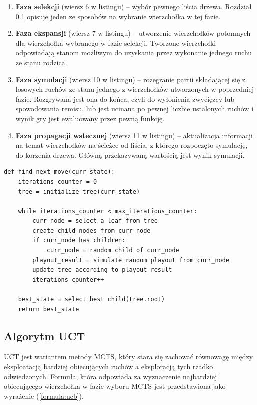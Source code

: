 \documentclass[a4paper,12pt]{article}
\begin{document}
\begin{enumerate}
	\item \textbf{Faza selekcji} (wiersz 6 w listingu) -- wybór pewnego liścia drzewa. Rozdział \ref{subsec:uct} opisuje jeden ze sposobów na wybranie wierzchołka w tej fazie.
	\item \textbf{Faza ekspansji} (wiersz 7 w listingu) -- utworzenie wierzchołków potomnych dla wierzchołka wybranego w fazie selekcji. Tworzone wierzchołki odpowiadają stanom możliwym do uzyskania przez wykonanie jednego ruchu ze stanu rodzica.
	\item \textbf{Faza symulacji} (wiersz 10 w listingu) -- rozegranie partii składającej się z losowych ruchów ze stanu jednego z wierzchołków utworzonych w poprzedniej fazie. Rozgrywana jest ona do końca, czyli do wyłonienia zwycięzcy lub spowodowania remisu, lub jest ucinana po pewnej liczbie ustalonych ruchów i wynik gry jest ewaluowany przez pewną funkcję.
	\item \textbf{Faza propagacji wstecznej} (wiersz 11 w listingu) -- aktualizacja informacji na temat wierzchołków na ścieżce od liścia, z którego rozpoczęto symulację, do korzenia drzewa. Główną przekazywaną wartością jest wynik symulacji.
\end{enumerate}

\begin{minipage}{\linewidth} %
	\begin{lstlisting}[caption={Pseudokod algorytmu Monte Carlo Tree Search}, label=lst:mcts, style=mystyle]
def find_next_move(curr_state):
	iterations_counter = 0
	tree = initialize_tree(curr_state)
	
	while iterations_counter < max_iterations_counter:
		curr_node = select a leaf from tree
		create child nodes from curr_node
		if curr_node has children:
			curr_node = random child of curr_node
		playout_result = simulate random playout from curr_node     
		update tree according to playout_result                     
		iterations_counter++
	
	best_state = select best child(tree.root) 
	return best_state
	\end{lstlisting}
\end{minipage}


\subsection{Algorytm UCT} \label{subsec:uct}
UCT jest wariantem metody MCTS, który stara się zachować równowagę między eksploatacją bardziej obiecujących ruchów a eksploracją tych rzadko odwiedzonych. Formuła, która odpowiada za wyznaczenie najbardziej obiecującego wierzchołka w fazie wyboru MCTS jest przedstawiona jako wyrażenie (\ref{formula:ucb}).
\end{document}
